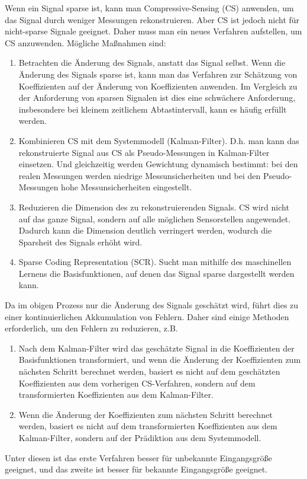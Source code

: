 \documentclass [a4paper, 10pt]{scrartcl}
\begin{document}
\Anfang

Wenn ein Signal sparse ist, kann man Compressive-Sensing (CS) anwenden, um das Signal durch weniger Messungen rekonstruieren. Aber CS ist jedoch nicht für nicht-sparse Signale geeignet. Daher muss man ein neues Verfahren aufstellen, um CS anzuwenden. Mögliche Maßnahmen sind:
\begin{enumerate}
\item Betrachten die Änderung des Signals, anstatt das Signal selbst. Wenn die Änderung des Signals sparse ist, kann man das Verfahren zur Schätzung von Koeffizienten auf der Änderung von Koeffizienten anwenden. Im Vergleich zu der Anforderung von sparsen Signalen ist dies eine schwächere Anforderung, insbesondere bei kleinem zeitlichem Abtastintervall, kann es häufig erfüllt werden.
\item Kombinieren CS mit dem Systemmodell (Kalman-Filter). D.h. man kann das rekonstruierte Signal aus CS als Pseudo-Messungen in Kalman-Filter einsetzen. Und gleichzeitig werden Gewichtung dynamisch bestimmt: bei den realen Messungen werden niedrige Messunsicherheiten und bei den Pseudo-Messungen hohe Messunsicherheiten eingestellt.
\item Reduzieren die Dimension des zu rekonstruierenden Signals. CS wird nicht auf das ganze Signal, sondern auf alle möglichen Sensorstellen angewendet. Dadurch kann die Dimension deutlich verringert werden, wodurch die Sparsheit des Signals erhöht wird.
\item Sparse Coding Representation (SCR). Sucht man mithilfe des maschinellen Lernens die Basisfunktionen, auf denen das Signal sparse dargestellt werden kann.
\end{enumerate}

Da im obigen Prozess nur die Änderung des Signals geschätzt wird, führt dies zu einer kontinuierlichen Akkumulation von Fehlern. Daher sind einige Methoden erforderlich, um den Fehlern zu reduzieren, z.B.
\begin{enumerate}
\item Nach dem Kalman-Filter wird das geschätzte Signal in die Koeffizienten der Basisfunktionen transformiert, und wenn die Änderung der Koeffizienten zum nächsten Schritt berechnet werden, basiert es nicht auf dem geschätzten Koeffizienten aus dem vorherigen CS-Verfahren, sondern auf dem transformierten Koeffizienten aus dem Kalman-Filter.
\item Wenn die Änderung der Koeffizienten zum nächsten Schritt berechnet werden, basiert es nicht auf dem transformierten Koeffizienten aus dem Kalman-Filter, sondern auf der Prädiktion aus dem Systemmodell.
\end{enumerate}
Unter diesen ist das erste Verfahren besser für unbekannte Eingangsgröße geeignet, und das zweite ist besser für bekannte Eingangsgröße geeignet.
\end{document}
